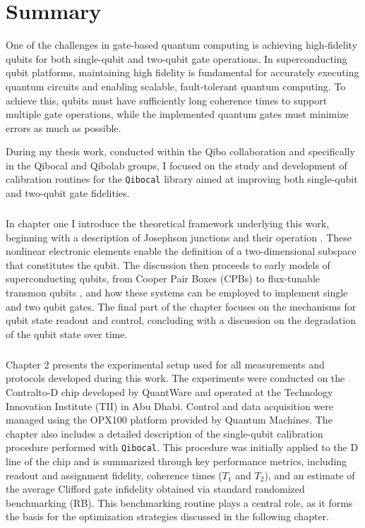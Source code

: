 \chapter{Summary}
One of the challenges in gate-based quantum computing is achieving high-fidelity qubits for both single-qubit and two-qubit gate operations.
In superconducting qubit platforms, maintaining high fidelity is fundamental for accurately executing quantum circuits and enabling scalable, fault-tolerant quantum computing. 
To achieve this, qubits must have sufficiently long coherence times to support multiple gate operations, while the implemented quantum gates must minimize errors as much as possible.

During my thesis work, conducted within the Qibo collaboration and specifically in the Qibocal and Qibolab groups, I focused on the study and development of calibration routines for the \texttt{Qibocal} library aimed at improving both single-qubit and two-qubit gate fidelities.

\paragraph{}
In chapter one I introduce the theoretical framework underlying this work, beginning with a description of Josephson junctions and their operation \cite{JOSEPHSON1962251}. 
These nonlinear electronic elements enable the definition of a two-dimensional subspace that constitutes the qubit. 
The discussion then proceeds to early models of superconducting qubits, from Cooper Pair Boxes (CPBs) \cite{Vion2002} to flux-tunable transmon qubits \cite{TransmonPaper}, and how these systems can be employed to implement single and two qubit gates. 
The final part of the chapter focuses on the mechanisms for qubit state readout and control, concluding with a discussion on the degradation of the qubit state over time.

\paragraph{}
Chapter 2 presents the experimental setup used for all measurements and protocols developed during this work. 
The experiments were conducted on the Contralto-D chip developed by QuantWare and operated at the Technology Innovation Institute (TII) in Abu Dhabi. 
Control and data acquisition were managed using the OPX100 platform provided by Quantum Machines.
The chapter also includes a detailed description of the single-qubit calibration procedure performed with \texttt{Qibocal}. 
This procedure was initially applied to the D line of the chip and is summarized through key performance metrics, including readout and assignment fidelity, coherence times ($T_1$ and $T_2$), and an estimate of the average Clifford gate infidelity obtained via standard randomized benchmarking (RB).
This benchmarking routine plays a central role, as it forms the basis for the optimization strategies discussed in the following chapter.

